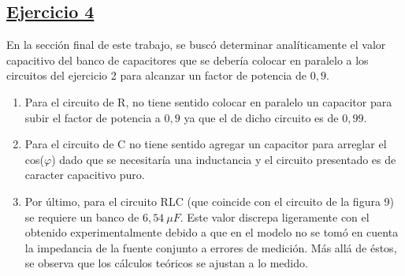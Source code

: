 \documentclass[a4paper]{article}
\begin{document}
\subsection*{\underline{Ejercicio 4}}
En la sección final de este trabajo, se buscó determinar analíticamente el valor capacitivo del banco de capacitores que se debería colocar en paralelo a los circuitos del ejercicio 2 para alcanzar un factor de potencia de $ 0,9 $. 
\begin{enumerate}

	\item Para el circuito de R, no tiene sentido colocar en paralelo un capacitor para subir el factor de potencia a $ 0,9 $ ya que el de dicho circuito es de $ 0,99 $.

	\item Para el circuito de C no tiene sentido agregar un capacitor para arreglar el cos($\varphi$) dado que se necesitaría una inductancia y el circuito presentado es de caracter capacitivo puro. 

	\item Por último, para el circuito RLC (que coincide con el circuito de la figura 9) se requiere un banco de $ 6,54 \ \mu F $. Este valor discrepa ligeramente con el obtenido experimentalmente debido a que en el modelo no se tomó en cuenta la impedancia de la fuente conjunto a errores de medición. Más allá de éstos, se observa que los cálculos teóricos se ajustan a lo medido.
\end{enumerate}
\end{document}
